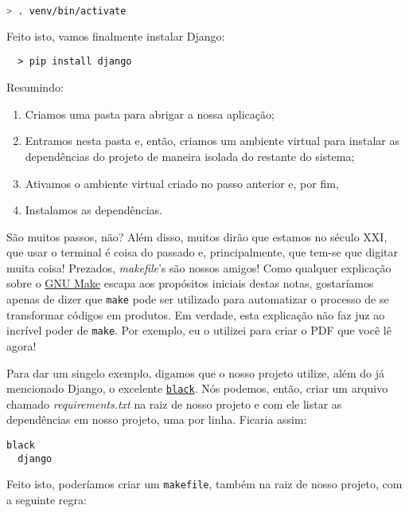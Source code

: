 \begin{lstlisting}[language=bash,caption={Ativando o ambiente virtual -- parte 2}]
  > . venv/bin/activate
\end{lstlisting}

Feito isto, vamos finalmente instalar Django:

\begin{lstlisting}
  > pip install django
\end{lstlisting}

Resumindo:

\begin{enumerate}
  \item
    Criamos uma pasta para abrigar a nossa aplicação;
  \item
    Entramos nesta pasta e, então, criamos um ambiente virtual para instalar as
    dependências do projeto de maneira isolada do restante do sistema;
  \item
    Ativamos o ambiente virtual criado no passo anterior e, por fim,
  \item
    Instalamos as dependências.
\end{enumerate}

São muitos passos, não? Além disso, muitos dirão que estamos no século XXI, que
usar o terminal é coisa do passado e, principalmente, que tem-se que digitar
muita coisa! Prezados, \textit{makefile}'s são nossos amigos! Como qualquer
explicação sobre o \href{https://www.gnu.org/software/make/}{GNU Make} escapa
aos propósitos iniciais destas notas, gostaríamos apenas de dizer que
\texttt{make} pode ser utilizado para automatizar o processo de se transformar
códigos em produtos. Em verdade, esta explicação não faz juz ao incrível poder
de \texttt{make}. Por exemplo, eu o utilizei para criar o PDF que você lê agora!

Para dar um singelo exemplo, digamos que o nosso projeto utilize, além do já
mencionado Django, o excelente
\href{https://github.com/psf/black}{\texttt{black}}. Nós podemos, então, criar
um arquivo chamado \textit{requirements.txt} na raiz de nosso projeto e com ele
listar as dependências em nosso projeto, uma por linha. Ficaria assim:

\begin{lstlisting}[caption={Um exemplo de requirements.txt}]
  black
  django
\end{lstlisting}

Feito isto, poderíamos criar um \texttt{makefile}, também na raiz de nosso
projeto, com a seguinte regra:


